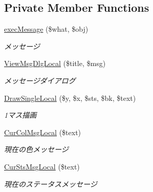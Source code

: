 \subsection*{Private Member Functions}
\begin{DoxyCompactItemize}
\item 
\hyperlink{class_reversi_play_ae8beea2648c1c5cf722364e84a90edf9}{exec\+Message} (\$what, \$obj)
\begin{DoxyCompactList}\small\item\em メッセージ \end{DoxyCompactList}\item 
\hyperlink{class_reversi_play_a2212d70313710a13422dd4fcb5da9cde}{View\+Msg\+Dlg\+Local} (\$title, \$msg)
\begin{DoxyCompactList}\small\item\em メッセージダイアログ \end{DoxyCompactList}\item 
\hyperlink{class_reversi_play_af0649b9d4a899e0802c739928136de99}{Draw\+Single\+Local} (\$y, \$x, \$sts, \$bk, \$text)
\begin{DoxyCompactList}\small\item\em 1マス描画 \end{DoxyCompactList}\item 
\hyperlink{class_reversi_play_aa217a221907e90c97719f8332c60a6d6}{Cur\+Col\+Msg\+Local} (\$text)
\begin{DoxyCompactList}\small\item\em 現在の色メッセージ \end{DoxyCompactList}\item 
\hyperlink{class_reversi_play_ae3da8fb1a3a365c6e5254e5cf6f1e7bc}{Cur\+Sts\+Msg\+Local} (\$text)
\begin{DoxyCompactList}\small\item\em 現在のステータスメッセージ \end{DoxyCompactList}\end{DoxyCompactItemize}
